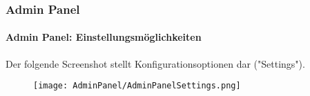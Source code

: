 
\begin{frame}[fragile]
	\frametitle{Admin Panel}
	\framesubtitle{Admin Panel: Einstellungsmöglichkeiten}

	Der folgende Screenshot stellt Konfigurationsoptionen dar ("Settings").

	\begin{figure}
		\texttt{[image: AdminPanel/AdminPanelSettings.png]}
	\end{figure}

\end{frame}


